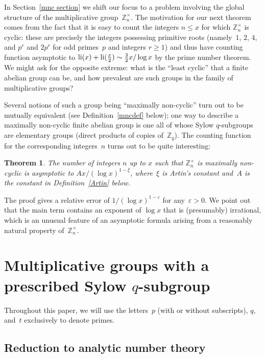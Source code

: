 \documentclass[12pt,reqno]{amsart}
\newtheorem{theorem}{Theorem}[section]
\theoremstyle{definition}
\newcommand{\Z}{{\mathbb Z}}
\newcommand{\ep}{\varepsilon}
\newcommand{\li}{\mathop{\rm li}}
\begin{document}
In Section~\ref{mnc section} we shift our focus to a problem involving the global structure of the multiplicative group~$\Z_n^\times$. The motivation for our next theorem comes from the fact that it is easy to count the integers $n\le x$ for which $\Z_n^\times$ is cyclic: these are precisely the integers possessing primitive roots (namely~$1$, $2$, $4$, and $p^r$ and $2p^r$ for odd primes~$p$ and integers $r\ge1$) and thus have counting function asymptotic to $\li(x)+\li(\frac x2) \sim \frac32x/\log x$ by the prime number theorem. We might ask for the opposite extreme: what is the ``least cyclic'' that a finite abelian group can be, and how prevalent are such groups in the family of multiplicative groups?

Several notions of such a group being ``maximally non-cyclic'' turn out to be mutually equivalent (see Definition~\ref{mncdef} below); one way to describe a maximally non-cyclic finite abelian group is one all of whose Sylow $q$-subgroups are elementary groups (direct products of copies of~$\Z_q$). The counting function for the corresponding integers~$n$ turns out to be quite interesting:

\begin{theorem} \label{mnc theorem}
The number of integers $n$ up to $x$ such that $\Z_n^\times$ is maximally non-cyclic is asymptotic to $Ax/(\log x)^{1-\xi}$, where~$\xi$ is Artin's constant and~$A$ is the constant in Definition~\ref{Artin} below.
\end{theorem}

\noindent The proof gives a relative error of $1/(\log x)^{1-\ep}$ for any~$\ep>0$. We point out that the main term contains an exponent of $\log x$ that is (presumably) irrational, which is an unusual feature of an asymptotic formula arising from a reasonably natural property of~$\Z_n^\times$.


\section{Multiplicative groups with a prescribed Sylow $q$-subgroup} \label{DHx section}

Throughout this paper, we will use the letters~$p$ (with or without subscripts), $q$, and~$t$ exclusively to denote primes.


\subsection{Reduction to analytic number theory}
\end{document}
